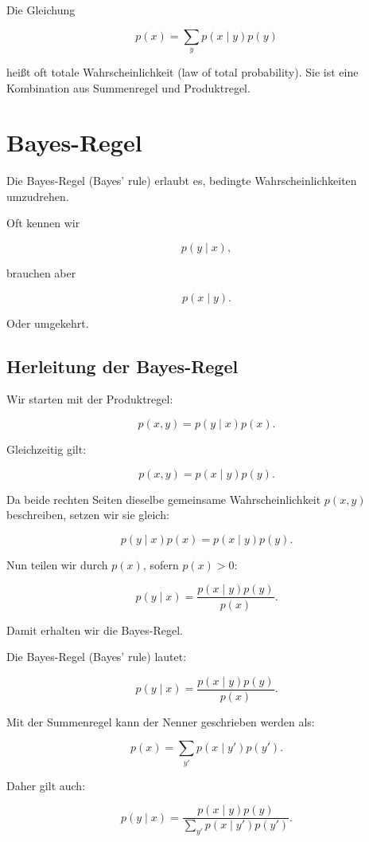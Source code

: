 \begin{conceptbox}
Die Gleichung

\[
    p(x)
    =
    \sum_y p(x \mid y)p(y)
\]

heißt oft totale Wahrscheinlichkeit (law of total probability).
Sie ist eine Kombination aus Summenregel und Produktregel.
\end{conceptbox}

\section{Bayes-Regel}

Die Bayes-Regel (Bayes' rule) erlaubt es, bedingte Wahrscheinlichkeiten umzudrehen.

Oft kennen wir

\[
    p(y \mid x),
\]

brauchen aber

\[
    p(x \mid y).
\]

Oder umgekehrt.

\subsection{Herleitung der Bayes-Regel}

Wir starten mit der Produktregel:

\[
    p(x,y)
    =
    p(y \mid x)p(x).
\]

Gleichzeitig gilt:

\[
    p(x,y)
    =
    p(x \mid y)p(y).
\]

Da beide rechten Seiten dieselbe gemeinsame Wahrscheinlichkeit \(p(x,y)\) beschreiben, setzen wir sie gleich:

\[
    p(y \mid x)p(x)
    =
    p(x \mid y)p(y).
\]

Nun teilen wir durch \(p(x)\), sofern \(p(x)>0\):

\[
    p(y \mid x)
    =
    \frac{p(x \mid y)p(y)}{p(x)}.
\]

Damit erhalten wir die Bayes-Regel.

\begin{definitionbox}
Die Bayes-Regel (Bayes' rule) lautet:

\[
    p(y \mid x)
    =
    \frac{p(x \mid y)p(y)}{p(x)}.
\]

Mit der Summenregel kann der Nenner geschrieben werden als:

\[
    p(x)
    =
    \sum_{y'} p(x \mid y')p(y').
\]

Daher gilt auch:

\[
    p(y \mid x)
    =
    \frac{
        p(x \mid y)p(y)
    }{
        \sum_{y'} p(x \mid y')p(y')
    }.
\]
\end{definitionbox}

